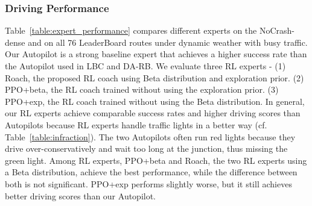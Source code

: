 \subsubsection{Driving Performance}

Table~\ref{table:expert_performance} compares different experts on the NoCrash-dense and on all 76 LeaderBoard routes under dynamic weather with busy traffic.
Our Autopilot is a strong baseline expert that achieves a higher success rate than the Autopilot used in LBC and DA-RB.
We evaluate three RL experts - 
(1) Roach, the proposed RL coach using Beta distribution and exploration prior.
(2) PPO+beta, the RL coach trained without using the exploration prior. 
(3) PPO+exp, the RL coach trained without using the Beta distribution.
In general, our RL experts achieve comparable success rates and higher driving scores than Autopilots because RL experts handle traffic lights in a better way (cf. Table~\ref{table:infraction}).
The two Autopilots often run red lights because they drive over-conservatively and wait too long at the junction, thus missing the green light.
Among RL experts, PPO+beta and Roach, the two RL experts using a Beta distribution, achieve the best performance, while the difference between both is not significant. PPO+exp performs slightly worse, but it still achieves better driving scores than our Autopilot. 


